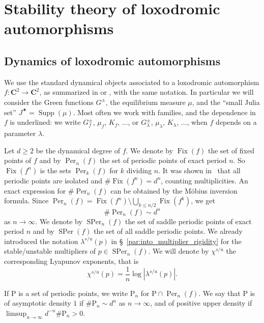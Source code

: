 \documentclass[oneside, 12pt]{amsart}
\newcommand{\abs}[1]{\left\vert#1\right\vert}
\newcommand{\unsur}[1]{\frac{1}{#1}}
\newcommand{\jstar}{J^\varstar}
\DeclareMathOperator{\supp}{Supp}
\DeclareMathOperator{\Per}{Per}
\DeclareMathOperator{\SPer}{SPer}
\DeclareMathOperator{\Fix}{Fix}
\newcommand{\C}{\mathbf{C}}
\theoremstyle{plain}
\theoremstyle{definition}
\numberwithin{equation}{section}       %
\numberwithin{equation}{section}       %
\begin{document}
\section{Stability theory of loxodromic automorphisms}\label{sec:prel_stab}

\subsection{Dynamics of loxodromic automorphisms}
\label{par:basics_on_loxodromic_automorphisms}
We use the standard dynamical objects associated to a loxodromic automorphism $f\colon \C^2\to \C^2$, 
as summarized  in \cite[\S 1]{bs6} or \cite[\S 2.1]{tangencies},  with the same notation. 
In particular we will consider the Green functions $G^\pm$, the equilibrium measure $\mu$, and the ``small Julia set'' $\jstar = \supp(\mu)$. Most often we work with families, and the  dependence in $f$  is underlined: we write $G^\pm_f$, $\mu_f$, $K_f$, $\ldots$, or $G^\pm_\lambda$, $\mu_\lambda$, $K_\lambda$, $\ldots$, when $f$ depends on a parameter $\lambda$. 

Let $d\geq 2$ be the dynamical degree of $f$. 
We denote by $\Fix (f)$ the set of fixed points of $f$ and by $\Per_n(f)$ the set of periodic points of exact period $n$. 
So $\Fix(f^n)$ is the sets  $\Per_k(f)$ for $k$ dividing $n$. 
It was  shown in~\cite[Thm 3.1]{friedland-milnor} that all periodic points are isolated and $\#\Fix(f^n) = d^n$, counting multiplicities. 
An exact expression for  $\#\Per_n(f)$ can be obtained by the   Möbius inversion formula. 
Since $\Per_n(f) =  \Fix(f^n)\setminus \bigcup_{k\leq n/2} \Fix(f^k)$,  we get  
\[
\#\Per_n(f)\sim d^n 
\] 
as $n\to\infty$.
We denote by  $\SPer_n(f)$ the set of saddle periodic points of exact period $n$ and by $\SPer(f)$ the set of all saddle periodic points.
We already introduced the notation $\lambda^{s/u}(p)$ in \S~\ref{par:into_multiplier_rigidity} 
for the stable/unstable multipliers of $p\in \SPer_n(f)$. 
We will  denote by $\chi^{s/u}$ the corresponding Lyapunov exponents, that is 
 \[
 \chi^{s/u}(p)   = \unsur{n} \log\abs{\lambda^{s/u}(p)}.
 \]


If $\mathrm{P}$ is a set of periodic points, we write $\mathrm{P}_n$  for $ \mathrm{P} \cap \Per_n(f)$. 
 We   say that   $\mathrm{P}$   is of asymptotic density $1$  if $\#\mathrm{P}_n  \sim d^n$ as $n\to\infty$, 
 and of   positive upper density if $\limsup_{n\to\infty} d^{-n}\#\mathrm{P}_ n  >0$.  
 
\end{document}
